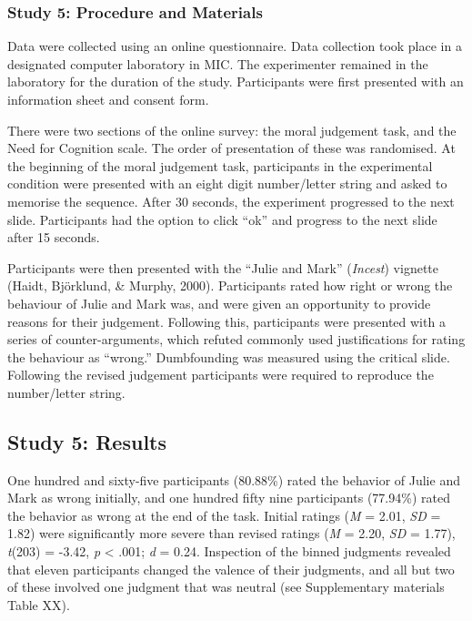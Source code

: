\documentclass[
  american,
  man,floatsintext]{apa7}
\begin{document}
\hypertarget{study-5-procedure-and-materials}{%
\subsubsection{Study 5: Procedure and Materials}\label{study-5-procedure-and-materials}}

Data were collected using an online questionnaire. Data collection took place in a designated computer laboratory in MIC. The experimenter remained in the laboratory for the duration of the study. Participants were first presented with an information sheet and consent form.

There were two sections of the online survey: the moral judgement task, and the Need for Cognition scale. The order of presentation of these was randomised. At the beginning of the moral judgement task, participants in the experimental condition were presented with an eight digit number/letter string and asked to memorise the sequence. After 30 seconds, the experiment progressed to the next slide. Participants had the option to click ``ok'' and progress to the next slide after 15 seconds.

Participants were then presented with the ``Julie and Mark'' (\emph{Incest}) vignette (Haidt, Björklund, \& Murphy, 2000). Participants rated how right or wrong the behaviour of Julie and Mark was, and were given an opportunity to provide reasons for their judgement. Following this, participants were presented with a series of counter-arguments, which refuted commonly used justifications for rating the behaviour as ``wrong.'' Dumbfounding was measured using the critical slide. Following the revised judgement participants were required to reproduce the number/letter string.

\hypertarget{study-5-results}{%
\subsection{Study 5: Results}\label{study-5-results}}

One hundred and sixty-five participants (80.88\%) rated the behavior of Julie and Mark as wrong initially, and one hundred fifty nine participants (77.94\%) rated the behavior as wrong at the end of the task. Initial ratings (\emph{M} = 2.01, \emph{SD} = 1.82) were significantly more severe than revised ratings (\emph{M} = 2.20, \emph{SD} = 1.77), \emph{t}(203) = -3.42, \emph{p} \textless{} .001; \emph{d} = 0.24. Inspection of the binned judgments revealed that eleven participants changed the valence of their judgments, and all but two of these involved one judgment that was neutral (see Supplementary materials Table XX).
\end{document}
